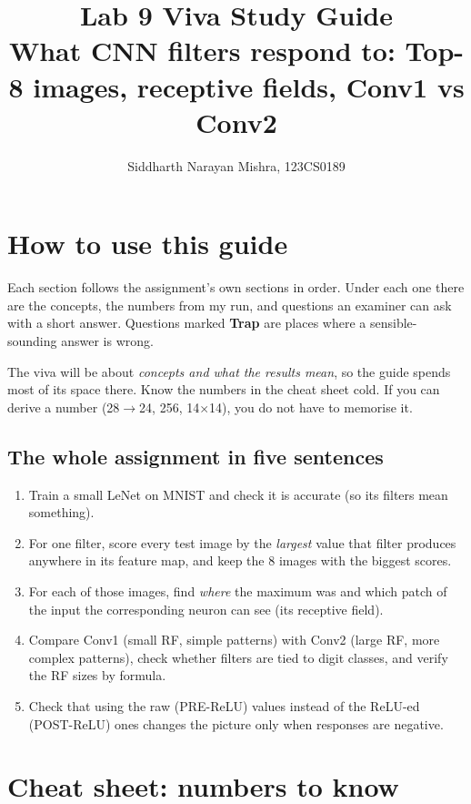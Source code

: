 \documentclass[11pt]{article}
\title{Lab 9 Viva Study Guide\\ \large What CNN filters respond to: Top-8 images, receptive fields, Conv1 vs Conv2}
\author{Siddharth Narayan Mishra, 123CS0189}
\date{}
\begin{document}
\maketitle
\tableofcontents
\newpage

\section{How to use this guide}

Each section follows the assignment's own sections in order. Under each one there are the concepts, the numbers from my run, and questions an examiner can ask with a short answer. Questions marked \textcolor{warn}{\textbf{Trap}} are places where a sensible-sounding answer is wrong.

The viva will be about \emph{concepts and what the results mean}, so the guide spends most of its space there. Know the numbers in the cheat sheet cold. If you can derive a number (28$\to$24, 256, 14$\times$14), you do not have to memorise it.

\subsection*{The whole assignment in five sentences}
\begin{enumerate}
\item Train a small LeNet on MNIST and check it is accurate (so its filters mean something).
\item For one filter, score every test image by the \emph{largest} value that filter produces anywhere in its feature map, and keep the 8 images with the biggest scores.
\item For each of those images, find \emph{where} the maximum was and which patch of the input the corresponding neuron can see (its receptive field).
\item Compare Conv1 (small RF, simple patterns) with Conv2 (large RF, more complex patterns), check whether filters are tied to digit classes, and verify the RF sizes by formula.
\item Check that using the raw (PRE-ReLU) values instead of the ReLU-ed (POST-ReLU) ones changes the picture only when responses are negative.
\end{enumerate}

\section{Cheat sheet: numbers to know}
\end{document}
